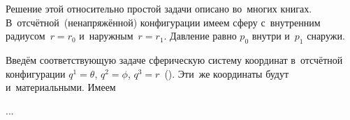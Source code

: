\label{para:hollowsphereunderpressure}

\begin{otherlanguage}{russian}

Решение этой относительно простой задачи описано во~многих книгах. В~отсчётной~(ненапряжённой) конфигурации имеем сферу с~внутренним радиусом~${r \!=\! r_0}$ и~наружным~${r \!=\! r_1}$. Давление равно $p_0$ внутри и~$p_1$ снаружи.

Введём соответствующую задаче сферическую систему координат в~отсчётной конфигурации ${q^1 = \theta}$, ${q^2 = \phi}$, ${q^3 = r}$~(). Эти~же координаты будут и~материальными. Имеем

...



\end{otherlanguage}

\newpage



\label{para:stressesAsLagrangeMultipliers}

